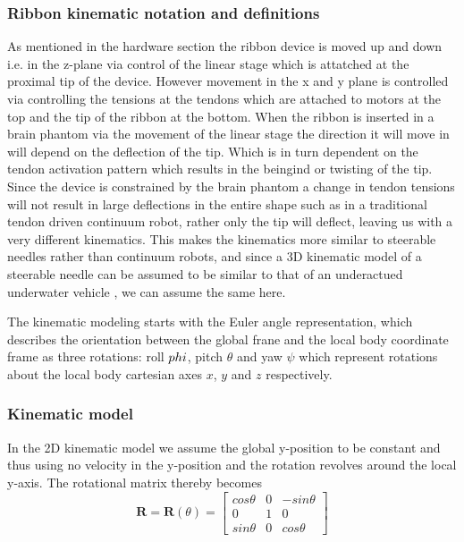 \subsubsection{Ribbon kinematic notation and definitions}
As mentioned in the hardware section the ribbon device is moved up and down i.e. in the z-plane via control of the linear stage which is attatched at the proximal tip of the device. However movement in the x and y plane is controlled via controlling the tensions at the tendons which are attached to motors at the top and the tip of the ribbon at the bottom. When the ribbon is inserted in a brain phantom via the movement of the linear stage the direction it will move in will depend on the deflection of the tip. Which is in turn dependent on the tendon activation pattern which results in the beingind or twisting of the tip. Since the device is constrained by the brain phantom a change in tendon tensions will not result in large deflections in the entire shape such as in a traditional tendon driven continuum robot, rather only the tip will deflect, leaving us with a very different kinematics. This makes the kinematics more similar to steerable needles rather than continuum robots, and since a 3D kinematic model of a steerable needle can be assumed to be similar to that of an underactued underwater vehicle \cite{secoli_closed-loop_2013}, we can assume the same here.  


The kinematic modeling starts with the Euler angle representation, which describes the orientation between the global frane and the local body coordinate frame as three rotations: roll \(\\phi\), pitch \(\theta\) and yaw \(\psi\) which represent rotations about the local body cartesian axes \(x\), \(y\) and \(z\) respectively.


\subsubsection{Kinematic model}
In the 2D kinematic model we assume the global y-position to be constant and thus using no velocity in the y-position and the rotation revolves around the local y-axis. The rotational matrix thereby becomes
\begin{equation}
    \textbf{R} = \textbf{R}(\theta) = \begin{bmatrix}
        cos \theta   &   0   &   -sin \theta \\
        0            &   1   &   0\\
        sin \theta   &   0   &   cos \theta
    \end{bmatrix}
\end{equation}

